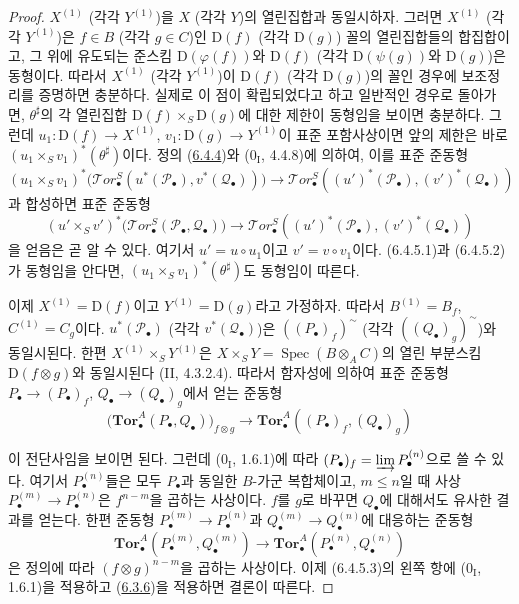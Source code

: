 \begin{proof}
$X^{(1)}$ (각각 $Y^{(1)}$)을 $X$ (각각 $Y$)의 열린집합과 동일시하자.
그러면 $X^{(1)}$ (각각 $Y^{(1)}$)은 $f\in B$ (각각 $g\in C$)인
$\mathrm D(f)$ (각각 $\mathrm D(g)$) 꼴의 열린집합들의 합집합이고,
그 위에 유도되는 준스킴 $\mathrm D(\varphi(f))$와 $\mathrm D(f)$
(각각 $\mathrm D(\psi(g))$와 $\mathrm D(g)$)은 동형이다. 따라서
$X^{(1)}$ (각각 $Y^{(1)}$)이 $\mathrm D(f)$ (각각 $\mathrm D(g)$)의
꼴인 경우에 보조정리를 증명하면 충분하다. 실제로 이 점이 확립되었다고
하고 일반적인 경우로 돌아가면, $\theta^\sharp$의 각 열린집합
$\mathrm D(f)\times_S\mathrm D(g)$에 대한 제한이 동형임을 보이면
충분하다. 그런데 $u_1:\mathrm D(f)\to X^{(1)}$,
$v_1:\mathrm D(g)\to Y^{(1)}$이 표준 포함사상이면 앞의 제한은 바로
$(u_1\times_S v_1)^*(\theta^\sharp)$이다. 정의
(\hyperref[III.6.4.4-fr]{6.4.4})와
($0_{\mathrm I}$, 4.4.8)에 의하여, 이를 표준 준동형
\[
  (u_1\times_S v_1)^*
  \bigl(\mathscr{T}\!or_\bullet^S
    (u^*(\mathscr P_\bullet),v^*(\mathscr Q_\bullet))\bigr)
  \longrightarrow
  \mathscr{T}\!or_\bullet^S
  ((u')^*(\mathscr P_\bullet),(v')^*(\mathscr Q_\bullet))
  \tag{6.4.5.1}\label{III.6.4.5.1.fr}
\]
과 합성하면 표준 준동형
\[
  (u'\times_S v')^*
  \bigl(\mathscr{T}\!or_\bullet^S(\mathscr P_\bullet,\mathscr Q_\bullet)\bigr)
  \longrightarrow
  \mathscr{T}\!or_\bullet^S
  ((u')^*(\mathscr P_\bullet),(v')^*(\mathscr Q_\bullet))
  \tag{6.4.5.2}\label{III.6.4.5.2.fr}
\]
을 얻음은 곧 알 수 있다. 여기서 $u'=u\circ u_1$이고
$v'=v\circ v_1$이다. (6.4.5.1)과 (6.4.5.2)가 동형임을 안다면,
$(u_1\times_S v_1)^*(\theta^\sharp)$도 동형임이 따른다.

이제 $X^{(1)}=\mathrm D(f)$이고 $Y^{(1)}=\mathrm D(g)$라고 가정하자.
따라서 $B^{(1)}=B_f$, $C^{(1)}=C_g$이다.
$u^*(\mathscr P_\bullet)$ (각각 $v^*(\mathscr Q_\bullet)$)은
$((P_\bullet)_f)^{\sim}$ (각각 $((Q_\bullet)_g)^{\sim}$)와 동일시된다.
한편 $X^{(1)}\times_S Y^{(1)}$은
$X\times_S Y=\operatorname{Spec}(B\otimes_A C)$의 열린 부분스킴
$\mathrm D(f\otimes g)$와 동일시된다 (II, 4.3.2.4). 따라서 함자성에
의하여 표준 준동형 $P_\bullet\to(P_\bullet)_f$,
$Q_\bullet\to(Q_\bullet)_g$에서 얻는 준동형
\[
  \bigl(\mathbf{Tor}_\bullet^A(P_\bullet,Q_\bullet)\bigr)_{f\otimes g}
  \longrightarrow
  \mathbf{Tor}_\bullet^A((P_\bullet)_f,(Q_\bullet)_g)
  \tag{6.4.5.3}\label{III.6.4.5.3.fr}
\]


이 전단사임을 보이면 된다. 그런데 ($0_{\mathrm I}$, 1.6.1)에 따라
$(P_\bullet)_f=\varinjlim P_\bullet^{(n)}$으로 쓸 수 있다. 여기서
$P_\bullet^{(n)}$들은 모두 $P_\bullet$과 동일한 $B$-가군 복합체이고,
$m\leqslant n$일 때 사상
$P_\bullet^{(m)}\to P_\bullet^{(n)}$은 $f^{n-m}$을 곱하는 사상이다.
$f$를 $g$로 바꾸면 $Q_\bullet$에 대해서도 유사한 결과를 얻는다.
한편 준동형 $P_\bullet^{(m)}\to P_\bullet^{(n)}$과
$Q_\bullet^{(m)}\to Q_\bullet^{(n)}$에 대응하는 준동형
\[
  \mathbf{Tor}_\bullet^A(P_\bullet^{(m)},Q_\bullet^{(m)})
  \longrightarrow
  \mathbf{Tor}_\bullet^A(P_\bullet^{(n)},Q_\bullet^{(n)})
\]
은 정의에 따라 $(f\otimes g)^{n-m}$을 곱하는 사상이다. 이제
(6.4.5.3)의 왼쪽 항에 ($0_{\mathrm I}$, 1.6.1)을 적용하고
(\hyperref[III.6.3.6-fr]{6.3.6})을 적용하면 결론이 따른다.
\end{proof}

